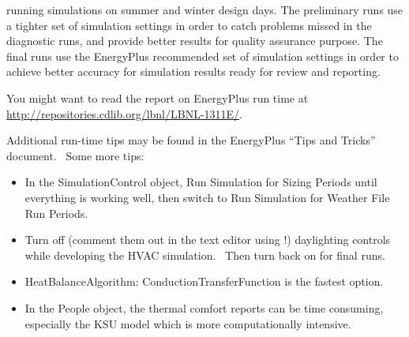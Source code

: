 running simulations on summer and winter design days. The preliminary runs use a tighter set of simulation settings in order to catch problems missed in the diagnostic runs, and provide better results for quality assurance purpose. The final runs use the EnergyPlus recommended set of simulation settings in order to achieve better accuracy for simulation results ready for review and reporting.

You might want to read the report on EnergyPlus run time at \url{http://repositories.cdlib.org/lbnl/LBNL-1311E/}.

Additional run-time tips may be found in the EnergyPlus ``Tips and Tricks'' document.~ Some more tips:

\begin{itemize}
\item
  In the SimulationControl object, Run Simulation for Sizing Periods until everything is working well, then switch to Run Simulation for Weather File Run Periods.
\item
  Turn off (comment them out in the text editor using !) daylighting controls while developing the HVAC simulation.~ Then turn back on for final runs.
\item
  HeatBalanceAlgorithm: ConductionTransferFunction is the fastest option.
\item
  In the People object, the thermal comfort reports can be time consuming, especially the KSU model which is more computationally intensive.
\end{itemize}
